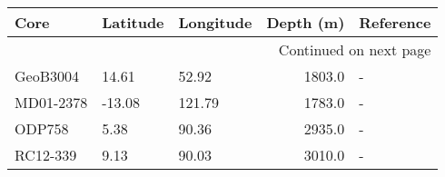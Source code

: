\begin{longtable}{lllrl}

      Core & Latitude & Longitude &  Depth (m) & Reference \\

\endhead

\multicolumn{5}{r}{{Continued on next page}} \\

\endfoot


\endlastfoot
  GeoB3004 &    14.61 &     52.92 &     1803.0 &         - \\
 MD01-2378 &   -13.08 &    121.79 &     1783.0 &         - \\
    ODP758 &     5.38 &     90.36 &     2935.0 &         - \\
  RC12-339 &     9.13 &     90.03 &     3010.0 &         - \\
\end{longtable}
